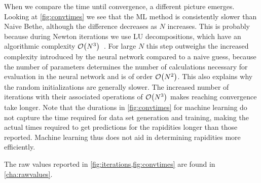\documentclass[11pt, a4paper]{report} %
\begin{document}
When we compare the time until convergence, a different picture emerges.
Looking at \cref{fig:convtimes} we see that the ML method is consistently slower than Naive Bethe, although the difference decreases as \(N\) increases.
This is probably because during Newton iterations we use LU decompositions, which have an algorithmic complexity \(\order{N^3}\)~\cite{Press2007}.
For large \(N\) this step outweighs the increased complexity introduced by the neural network compared to a naive guess, because the number of parameters determines the number of calculations necessary for evaluation in the neural network and is of order \(\order{N^2}\).
This also explains why the random initializations are generally slower. 
The increased number of iterations with their associated operations of \(\order{N^3}\) makes reaching convergence take longer.
Note that the durations in \cref{fig:convtimes} for machine learning do not capture the time required for data set generation and training, making the actual times required to get predictions for the rapidities longer than those reported.
Machine learning thus does not aid in determining rapidities more efficiently.

The raw values reported in \cref{fig:iterations,fig:convtimes} are found in \cref{cha:rawvalues}.
\end{document}
